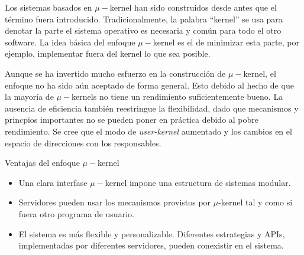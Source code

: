 Los sistemas basados en $\mu-$kernel han sido construidos desde antes que el término fuera introducido. Tradicionalmente, la palabra ``kernel'' se usa para denotar la parte el sistema operativo es necesaria y común para todo el otro software. La idea básica del enfoque $\mu-$kernel es el de minimizar esta parte, por ejemplo, implementar fuera del kernel lo que sea posible.

Aunque se ha invertido mucho esfuerzo en la construcción de $\mu-$kernel, el enfoque no ha sido aún aceptado de forma general. Esto debido al hecho de que la mayoría de $\mu-$kernels no tiene un rendimiento suficientemente bueno. La ausencia de eficiencia también reestringue la flexibilidad, dado que mecanismos y princpios importantes no se pueden poner en práctica debido al pobre rendimiento. Se cree que el modo de \textit{user-kernel} aumentado y los cambios en el espacio de direcciones con los responsables.

Ventajas del enfoque $\mu-$kernel\:
\begin{itemize}
    \item Una clara interfase $\mu-$kernel impone una estructura de sistemas modular.
    \item Servidores pueden usar los mecanismos provistos por $\mu$-kernel tal y como si fuera otro programa de usuario.
    \item El sistema es más flexible y personalizable. Diferentes estrategias y APIs, implementadas por diferentes servidores, pueden conexistir en el sistema.
\end{itemize}

